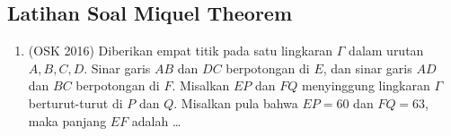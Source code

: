 \subsection{Latihan Soal Miquel Theorem}
\begin{enumerate}
    \item (OSK 2016) Diberikan empat titik pada satu lingkaran $\Gamma$ dalam urutan $A,B,C,D$. Sinar garis $AB$ dan $DC$ berpotongan di $E$, dan sinar garis $AD$ dan $BC$ berpotongan di $F$. Misalkan $EP$ dan $FQ$ menyinggung lingkaran $\Gamma$ berturut-turut di $P$ dan $Q$. Misalkan pula bahwa $EP=60$ dan $FQ=63$, maka panjang $EF$ adalah \dots
\end{enumerate}